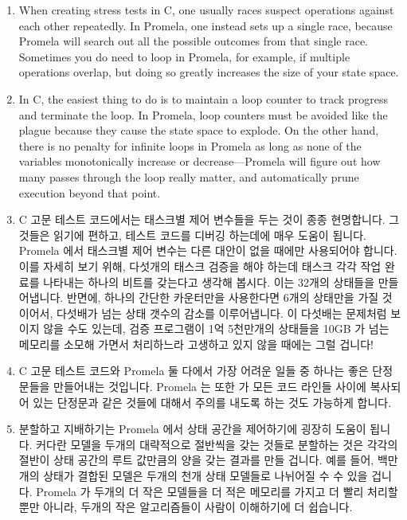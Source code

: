 \begin{enumerate}
\item	When creating stress tests in C, one usually races suspect operations
	against each other repeatedly.	In Promela, one instead sets up
	a single race, because Promela will search out all the possible
	outcomes from that single race.	Sometimes you do need to loop
	in Promela, for example, if multiple operations overlap, but
	doing so greatly increases the size of your state space.
\item	In C, the easiest thing to do is to maintain a loop counter to track
	progress and terminate the loop.  In Promela, loop counters
	must be avoided like the plague because they cause the state
	space to explode.  On the other hand, there is no penalty for
	infinite loops in Promela as long as none of the variables
	monotonically increase or decrease---Promela will figure out
	how many passes through the loop really matter, and automatically
	prune execution beyond that point.
\fi
\item	C 고문 테스트 코드에서는 태스크별 제어 변수들을 두는 것이 종종
	현명합니다.
	그것들은 읽기에 편하고, 테스트 코드를 디버깅 하는데에 매우 도움이
	됩니다.
	Promela 에서 태스크별 제어 변수는 다른 대안이 없을 때에만 사용되어야
	합니다.
	이를 자세히 보기 위해, 다섯개의 태스크 검증을 해야 하는데 태스크 각각
	작업 완료를 나타내는 하나의 비트를 갖는다고 생각해 봅시다.
	이는 32개의 상태들을 만들어냅니다.
	반면에, 하나의 간단한 카운터만을 사용한다면 6개의 상태만을 가질
	것이어서, 다섯배가 넘는 상태 갯수의 감소를 이루어냅니다.
	이 다섯배는 문제처럼 보이지 않을 수도 있는데, 검증 프로그램이 1억
	5천만개의 상태들을 10GB 가 넘는 메모리를 소모해 가면서 처리하느라
	고생하고 있지 않을 때에는 그럴 겁니다!
\item	C 고문 테스트 코드와 Promela 둘 다에서 가장 어려운 일들 중 하나는 좋은
	단정문들을 만들어내는 것입니다.
	Promela 는 또한  가 모든 코드 라인들 사이에 복사되어 있는
	단정문과 같은 것들에 대해서 주의를 내도록 하는 것도 가능하게 합니다.
\item	분할하고 지배하기는 Promela 에서 상태 공간을 제어하기에 굉장히 도움이
	됩니다.
	커다란 모델을 두개의 대략적으로 절반씩을 갖는 것들로 분할하는 것은
	각각의 절반이 상태 공간의 루트 값만큼의 양을 갖는 결과를 만들 겁니다.
	예를 들어, 백만개의 상태가 결합된 모델은 두개의 천개 상태 모델들로
	나뉘어질 수 수 있을 겁니다.
	Promela 가 두개의 더 작은 모델들을 더 적은 메모리를 가지고 더 빨리
	처리할 뿐만 아니라, 두개의 작은 알고리즘들이 사람이 이해하기에 더
	쉽습니다.
\iffalse


\end{enumerate}
